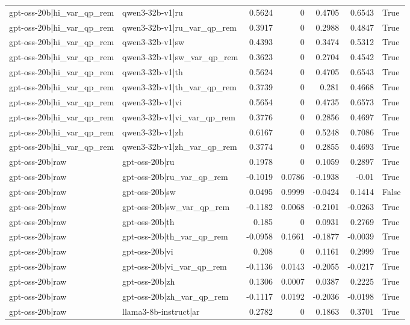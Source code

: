 \begin{table}
\begin{tabular}{l l r r r r l}
gpt-oss-20b|hi_var_qp_rem & qwen3-32b-v1|ru & 0.5624 & 0 & 0.4705 & 0.6543 & True \\
gpt-oss-20b|hi_var_qp_rem & qwen3-32b-v1|ru_var_qp_rem & 0.3917 & 0 & 0.2988 & 0.4847 & True \\
gpt-oss-20b|hi_var_qp_rem & qwen3-32b-v1|sw & 0.4393 & 0 & 0.3474 & 0.5312 & True \\
gpt-oss-20b|hi_var_qp_rem & qwen3-32b-v1|sw_var_qp_rem & 0.3623 & 0 & 0.2704 & 0.4542 & True \\
gpt-oss-20b|hi_var_qp_rem & qwen3-32b-v1|th & 0.5624 & 0 & 0.4705 & 0.6543 & True \\
gpt-oss-20b|hi_var_qp_rem & qwen3-32b-v1|th_var_qp_rem & 0.3739 & 0 & 0.281 & 0.4668 & True \\
gpt-oss-20b|hi_var_qp_rem & qwen3-32b-v1|vi & 0.5654 & 0 & 0.4735 & 0.6573 & True \\
gpt-oss-20b|hi_var_qp_rem & qwen3-32b-v1|vi_var_qp_rem & 0.3776 & 0 & 0.2856 & 0.4697 & True \\
gpt-oss-20b|hi_var_qp_rem & qwen3-32b-v1|zh & 0.6167 & 0 & 0.5248 & 0.7086 & True \\
gpt-oss-20b|hi_var_qp_rem & qwen3-32b-v1|zh_var_qp_rem & 0.3774 & 0 & 0.2855 & 0.4693 & True \\
gpt-oss-20b|raw & gpt-oss-20b|ru & 0.1978 & 0 & 0.1059 & 0.2897 & True \\
gpt-oss-20b|raw & gpt-oss-20b|ru_var_qp_rem & -0.1019 & 0.0786 & -0.1938 & -0.01 & True \\
gpt-oss-20b|raw & gpt-oss-20b|sw & 0.0495 & 0.9999 & -0.0424 & 0.1414 & False \\
gpt-oss-20b|raw & gpt-oss-20b|sw_var_qp_rem & -0.1182 & 0.0068 & -0.2101 & -0.0263 & True \\
gpt-oss-20b|raw & gpt-oss-20b|th & 0.185 & 0 & 0.0931 & 0.2769 & True \\
gpt-oss-20b|raw & gpt-oss-20b|th_var_qp_rem & -0.0958 & 0.1661 & -0.1877 & -0.0039 & True \\
gpt-oss-20b|raw & gpt-oss-20b|vi & 0.208 & 0 & 0.1161 & 0.2999 & True \\
gpt-oss-20b|raw & gpt-oss-20b|vi_var_qp_rem & -0.1136 & 0.0143 & -0.2055 & -0.0217 & True \\
gpt-oss-20b|raw & gpt-oss-20b|zh & 0.1306 & 0.0007 & 0.0387 & 0.2225 & True \\
gpt-oss-20b|raw & gpt-oss-20b|zh_var_qp_rem & -0.1117 & 0.0192 & -0.2036 & -0.0198 & True \\
gpt-oss-20b|raw & llama3-8b-instruct|ar & 0.2782 & 0 & 0.1863 & 0.3701 & True \\

\end{tabular}
\end{table}
